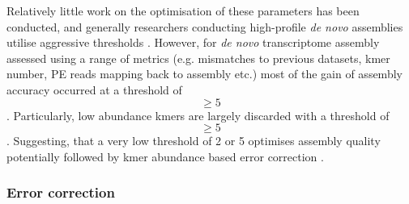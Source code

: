 Relatively little work on the optimisation of these parameters has been conducted, and generally
researchers conducting high-profile \textit{de novo} assemblies utilise aggressive thresholds \citep{MacManes2014}.
However, for \textit{de novo} transcriptome assembly assessed using a range of metrics
(e.g. mismatches to previous datasets, kmer number, PE reads mapping back to assembly etc.)
most of the gain of assembly accuracy occurred at a threshold of \[\geq 5\].
Particularly, low abundance kmers are largely discarded with a threshold of \[\geq 5\].
Suggesting, that a very low threshold of 2 or 5 optimises assembly quality potentially
followed by kmer abundance based error correction \citep{MacManes2014}.











\subsubsection{Error correction}

